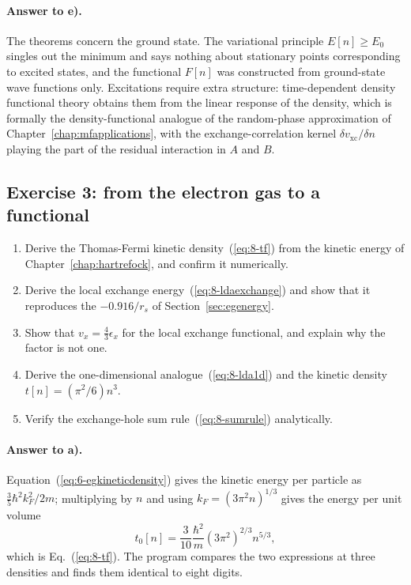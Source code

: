 \paragraph{Answer to e).}
The theorems concern the ground state.  The variational principle
$E[n]\ge E_0$ singles out the minimum and says nothing about stationary
points corresponding to excited states, and the functional $F[n]$ was
constructed from ground-state wave functions only.  Excitations require
extra structure: time-dependent density functional theory obtains them from
the linear response of the density, which is formally the density-functional
analogue of the random-phase approximation of
Chapter~\ref{chap:mfapplications}, with the exchange-correlation kernel
$\delta v_{\mathrm{xc}}/\delta n$ playing the part of the residual
interaction in $A$ and $B$.

\subsection*{Exercise 3: from the electron gas to a functional}
\label{ex:8-gas}

\begin{enumerate}
  \item[a)] Derive the Thomas-Fermi kinetic density~(\ref{eq:8-tf}) from the
  kinetic energy of Chapter~\ref{chap:hartrefock}, and confirm it numerically.
  \item[b)] Derive the local exchange energy~(\ref{eq:8-ldaexchange}) and show
  that it reproduces the $-0.916/r_s$ of Section~\ref{sec:egenergy}.
  \item[c)] Show that $v_x=\tfrac43\epsilon_x$ for the local exchange
  functional, and explain why the factor is not one.
  \item[d)] Derive the one-dimensional analogue~(\ref{eq:8-lda1d}) and the
  kinetic density $t[n]=(\pi^2/6)n^3$.
  \item[e)] Verify the exchange-hole sum rule~(\ref{eq:8-sumrule})
  analytically.
\end{enumerate}

\paragraph{Answer to a).}
Equation~(\ref{eq:6-egkineticdensity}) gives the kinetic energy per particle
as $\tfrac35\hbar^2k_F^2/2m$; multiplying by $n$ and using
$k_F=(3\pi^2n)^{1/3}$ gives the energy per unit volume
\begin{equation}
  t_0[n] = \frac{3}{10}\frac{\hbar^2}{m}\left(3\pi^2\right)^{2/3}n^{5/3},
  \label{eq:8-exa3}
\end{equation}
which is Eq.~(\ref{eq:8-tf}).  The program compares the two expressions at
three densities and finds them identical to eight digits.

